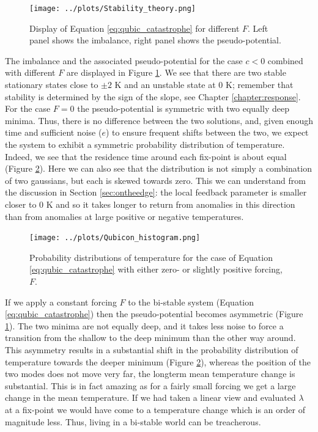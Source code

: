 \documentclass[12pt]{book}
\begin{document}
\begin{figure}
	\begin{center}
		\texttt{[image: ../plots/Stability\_theory.png]}
	\end{center}
	\caption{ Display of Equation \ref{eq:qubic_catastrophe} for different $F$. Left panel shows the imbalance, right panel shows the pseudo-potential. } 
	\label{fig:bi-stable_theory}
\end{figure}

The imbalance and the associated pseudo-potential for the case $c<0$ combined with different $F$ are displayed in Figure \ref{fig:bi-stable_theory}. We see that there are two stable stationary states close to $\pm 2 $ K and an unstable state at 0 K; remember that stability is determined by the sign of the slope, see Chapter \ref{chapter:response}. 
For the case $F=0$ the pseudo-potential is symmetric with two equally deep minima. Thus, there is no difference between the two solutions, and, given enough time and sufficient noise ($e$) to ensure frequent shifts between the two, we expect the system to exhibit a symmetric probability distribution of temperature. Indeed, we see that the residence time around each fix-point is about equal (Figure \ref{fig:bi-stable_histogram}). Here we can also see that the distribution is not simply a combination of two gaussians, but each is skewed towards zero. This we can understand from the discussion in Section \ref{sec:ontheedge}: the local feedback parameter is smaller closer to 0 K and so it takes longer to return from anomalies in this direction than from anomalies at large positive or negative temperatures.
\begin{figure}
	\begin{center}
		\texttt{[image: ../plots/Qubicon\_histogram.png]}
	\end{center}
	\caption{ Probability distributions of temperature for the case of Equation \ref{eq:qubic_catastrophe} with either zero- or slightly positive forcing, $F$.  } 
	\label{fig:bi-stable_histogram}
\end{figure}

If we apply a constant forcing $F$ to the bi-stable system (Equation \ref{eq:qubic_catastrophe}) then the pseudo-potential becomes asymmetric (Figure \ref{fig:bi-stable_theory}). The two minima are not equally deep, and it takes less noise to force a transition from the shallow to the deep minimum than the other way around. This asymmetry results in a substantial shift in the probability distribution of temperature towards the deeper minimum (Figure \ref{fig:bi-stable_histogram}), whereas the position of the two modes does not move very far, the longterm mean temperature change is substantial. This is in fact amazing as for a fairly small forcing we get a large change in the mean temperature. If we had taken a linear view and evaluated $\lambda$ at a fix-point we would have come to a temperature change which is an order of magnitude less. Thus, living in a bi-stable world can be treacherous.
\\
\end{document}
